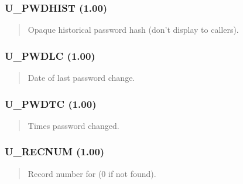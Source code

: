 \documentclass[letterpaper,10pt,english]{sphinxmanual}
\begin{document}
\subsubsection{U\_PWDHIST (1.00)}
\label{\detokenize{ppl:u-pwdhist-1-00}}\begin{quote}

\sphinxAtStartPar
{}
\begin{description}
\sphinxAtStartPar
Opaque historical password hash (don’t display to callers).

\end{description}
\end{quote}


\subsubsection{U\_PWDLC (1.00)}
\label{\detokenize{ppl:u-pwdlc-1-00}}\begin{quote}

\sphinxAtStartPar
{}
\begin{description}
\sphinxAtStartPar
Date of last password change.

\end{description}
\end{quote}


\subsubsection{U\_PWDTC (1.00)}
\label{\detokenize{ppl:u-pwdtc-1-00}}\begin{quote}

\sphinxAtStartPar
{}
\begin{description}
\sphinxAtStartPar
Times password changed.

\end{description}
\end{quote}


\subsubsection{U\_RECNUM (1.00)}
\label{\detokenize{ppl:u-recnum-1-00}}\begin{quote}

\sphinxAtStartPar
{}
\begin{description}
\sphinxAtStartPar
Record number for  (0 if not found).

\end{description}
\end{quote}
\end{document}
